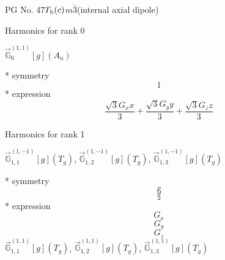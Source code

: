 \documentclass[fleqn,8pt]{jsarticle}
\begin{document}
\setcounter{MaxMatrixCols}{32}

\renewcommand{\tablename}{Table~}
\renewcommand{\figurename}{Figure~}
\begin{center}
\LARGE
PG No. 47\quad$T_{\rm h}(c)$\quad$m\bar{3}$\quad[ cubic ] (internal axial dipole)
\end{center}

\noindent * Harmonics for rank 0

\noindent\quad $\vec{\mathbb{G}}_{0}^{(1,1)}[g](A_{u})$

\noindent\quad ** symmetry
\begin{dmath*}
1
\end{dmath*}
\noindent\quad ** expression
\begin{dmath*}
\frac{\sqrt{3} G_{x} x}{3} + \frac{\sqrt{3} G_{y} y}{3} + \frac{\sqrt{3} G_{z} z}{3}
\end{dmath*}

\noindent * Harmonics for rank 1

\noindent\quad $\vec{\mathbb{G}}_{1,1}^{(1,-1)}[g](T_{g})$, $\vec{\mathbb{G}}_{1,2}^{(1,-1)}[g](T_{g})$, $\vec{\mathbb{G}}_{1,3}^{(1,-1)}[g](T_{g})$

\noindent\quad ** symmetry
\begin{dmath*}
x
\end{dmath*}
\begin{dmath*}
y
\end{dmath*}
\begin{dmath*}
z
\end{dmath*}
\noindent\quad ** expression
\begin{dmath*}
G_{x}
\end{dmath*}
\begin{dmath*}
G_{y}
\end{dmath*}
\begin{dmath*}
G_{z}
\end{dmath*}
\noindent\quad $\vec{\mathbb{G}}_{1,1}^{(1,1)}[g](T_{g})$, $\vec{\mathbb{G}}_{1,2}^{(1,1)}[g](T_{g})$, $\vec{\mathbb{G}}_{1,3}^{(1,1)}[g](T_{g})$
\end{document}
